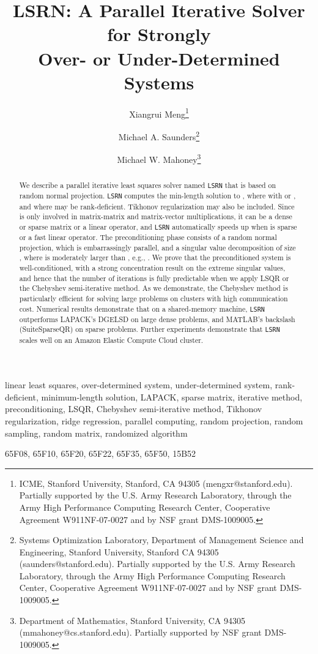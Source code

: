 \documentclass{siamltex}
\title{LSRN: A Parallel Iterative Solver for Strongly
    \\ Over- or Under-Determined Systems}
\author{Xiangrui Meng\thanks{ICME, Stanford University, Stanford, CA 94305 (mengxr@stanford.edu).
    Partially supported by the U.S. Army Research Laboratory, through the
    Army High Performance Computing Research Center, Cooperative Agreement W911NF-07-0027
    and by NSF grant DMS-1009005.}
  \and Michael A. Saunders\thanks{Systems Optimization Laboratory, Department of Management Science and
    Engineering, Stanford University, Stanford CA 94305 (saunders@stanford.edu).
    Partially supported by the U.S. Army Research Laboratory, through the
    Army High Performance Computing Research Center, Cooperative Agreement W911NF-07-0027
    and by NSF grant DMS-1009005.}
  \and Michael W. Mahoney\thanks{Department of Mathematics, Stanford University, CA 94305 (mmahoney@cs.stanford.edu).
    Partially supported by NSF grant DMS-1009005.}}
\begin{document}
\maketitle

\begin{abstract}
  We describe a parallel iterative least squares solver named \texttt{LSRN} that
  is based on random normal projection.  \texttt{LSRN} computes the
  min-length solution to , where  with  or , and where  may be
  rank-deficient. Tikhonov regularization may also be included. Since  is
  only involved in matrix-matrix and matrix-vector multiplications, it can be a
  dense or sparse matrix or a linear operator, and \texttt{LSRN} automatically
  speeds up when  is sparse or a fast linear operator. The preconditioning
  phase consists of a random normal projection, which is embarrassingly
  parallel, and a singular value decomposition of size , where  is moderately larger than , e.g.,
  .  We prove that the preconditioned system is well-conditioned,
  with a strong concentration result on the extreme singular values, and hence
  that the number of iterations is fully predictable when we apply LSQR or the
  Chebyshev semi-iterative method.  As we demonstrate, the Chebyshev method is
  particularly efficient for solving large problems on clusters with high
  communication cost.  Numerical results demonstrate that on a shared-memory
  machine, \texttt{LSRN} outperforms LAPACK's DGELSD on large dense problems,
  and MATLAB's backslash (SuiteSparseQR) on sparse problems. Further experiments
  demonstrate that \texttt{LSRN} scales well on an Amazon Elastic Compute Cloud
  cluster.
\end{abstract}

\begin{keywords}
  linear least squares, over-determined system, under-determined system,
  rank-deficient, minimum-length solution, LAPACK, sparse matrix, iterative
  method, preconditioning, LSQR, Chebyshev semi-iterative method, Tikhonov
  regularization, ridge regression, parallel computing, random projection,
  random sampling, random matrix, randomized algorithm
\end{keywords}

\begin{AMS}
  65F08,                        65F10,                        65F20,                        65F22,                        65F35,                        65F50,                        15B52                         \end{AMS}
\end{document}
